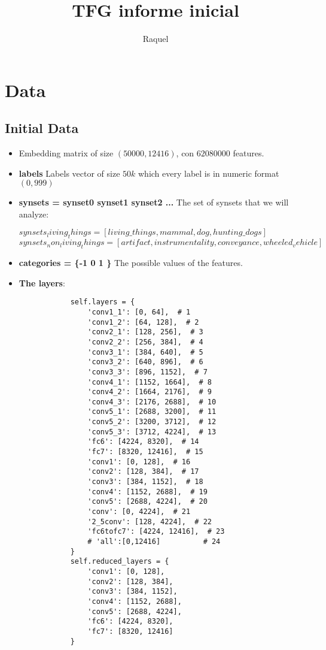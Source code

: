 \documentclass{article}
\title{TFG informe inicial}
\author{Raquel}
\begin{document}
\maketitle

\tableofcontents

\section{Data}
\subsection{Initial Data}
\begin{itemize}
	\item Embedding matrix of size $(50000, 12416)$, con $62080000$ features.
	\item \textbf{labels} Labels vector of size $50k$ which every label is in numeric format $(0,999)$
	\item \textbf{synsets = synset0 synset1 synset2 ...} The set of synsets that we will analyze: 
	      	      	      
	      $synsets_living_things = [living\_things, mammal, dog, hunting\_dogs]$
	      $synsets_non_living_things = [artifact, instrumentality, conveyance, wheeled_vehicle]$
	      	      	      
	\item \textbf{categories = \{-1 0 1 \}} The possible values of the features.
	\item \textbf{The layers}:
	      \begin{verbatim}
	      	self.layers = {
	      		'conv1_1': [0, 64],  # 1
	      		'conv1_2': [64, 128],  # 2
	      		'conv2_1': [128, 256],  # 3
	      		'conv2_2': [256, 384],  # 4
	      		'conv3_1': [384, 640],  # 5
	      		'conv3_2': [640, 896],  # 6
	      		'conv3_3': [896, 1152],  # 7
	      		'conv4_1': [1152, 1664],  # 8
	      		'conv4_2': [1664, 2176],  # 9
	      		'conv4_3': [2176, 2688],  # 10
	      		'conv5_1': [2688, 3200],  # 11
	      		'conv5_2': [3200, 3712],  # 12
	      		'conv5_3': [3712, 4224],  # 13
	      		'fc6': [4224, 8320],  # 14
	      		'fc7': [8320, 12416],  # 15
	      		'conv1': [0, 128],  # 16
	      		'conv2': [128, 384],  # 17
	      		'conv3': [384, 1152],  # 18
	      		'conv4': [1152, 2688],  # 19
	      		'conv5': [2688, 4224],  # 20
	      		'conv': [0, 4224],  # 21
	      		'2_5conv': [128, 4224],  # 22
	      		'fc6tofc7': [4224, 12416],  # 23
	      		# 'all':[0,12416]          # 24
	      	}
	      	self.reduced_layers = {
	      		'conv1': [0, 128],
	      		'conv2': [128, 384],
	      		'conv3': [384, 1152],
	      		'conv4': [1152, 2688],
	      		'conv5': [2688, 4224],
	      		'fc6': [4224, 8320],
	      		'fc7': [8320, 12416]
	      	}
	      \end{verbatim}
\end{itemize}
\end{document}
